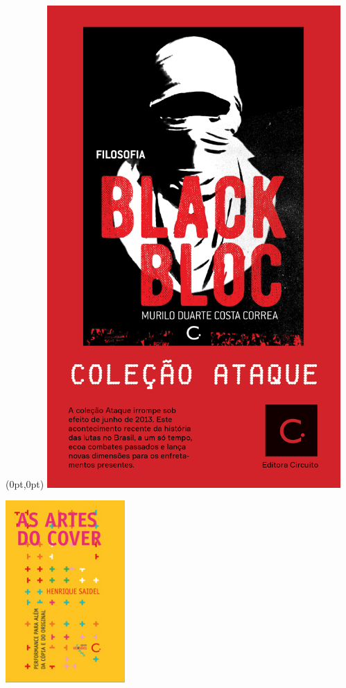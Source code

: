 \pagestyle{circuito}
\label{circuito}

\begin{textblock*}{5.625in}(0pt,0pt)%
\vspace*{-1.45cm}
\hspace*{-1.8cm}\includegraphics*[width=112mm]{./imgs/CIRCUITO.png}
\end{textblock*}

\pagebreak

\hspace{.5cm}

\begin{center}
\hspace*{-2.5cm}
\hspace{2cm}\includegraphics[width=45.4mm]{./imgs/cover.jpg}
\end{center}

